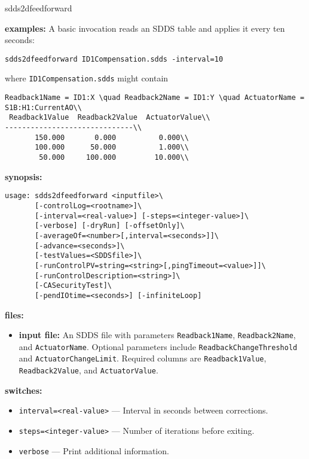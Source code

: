 \begin{sddsprog}{sdds2dfeedforward}
\item \textbf{examples:}
A basic invocation reads an SDDS table and applies it every ten seconds:
\begin{verbatim}
sdds2dfeedforward ID1Compensation.sdds -interval=10
\end{verbatim}
where \verb+ID1Compensation.sdds+ might contain
\begin{verbatim}
Readback1Name = ID1:X \quad Readback2Name = ID1:Y \quad ActuatorName = S1B:H1:CurrentAO\\
 Readback1Value  Readback2Value  ActuatorValue\\
------------------------------\\
       150.000       0.000          0.000\\
       100.000      50.000          1.000\\
        50.000     100.000         10.000\\
\end{verbatim}
\item \textbf{synopsis:}
\begin{verbatim}
usage: sdds2dfeedforward <inputfile>\
       [-controlLog=<rootname>]\
       [-interval=<real-value>] [-steps=<integer-value>]\
       [-verbose] [-dryRun] [-offsetOnly]\
       [-averageOf=<number>[,interval=<seconds>]]\
       [-advance=<seconds>]\
       [-testValues=<SDDSfile>]\
       [-runControlPV=string=<string>[,pingTimeout=<value>]]\
       [-runControlDescription=<string>]\
       [-CASecurityTest]\
       [-pendIOtime=<seconds>] [-infiniteLoop]
\end{verbatim}
\item \textbf{files:}
\begin{itemize}
  \item \textbf{input file:} An SDDS file with parameters \verb+Readback1Name+,
  \verb+Readback2Name+, and \verb+ActuatorName+.  Optional parameters include
  \verb+ReadbackChangeThreshold+ and \verb+ActuatorChangeLimit+.  Required
  columns are \verb+Readback1Value+, \verb+Readback2Value+, and
  \verb+ActuatorValue+.
\end{itemize}
\item \textbf{switches:}
\begin{itemize}
  \item {\tt interval=<real-value>} --- Interval in seconds between corrections.
  \item {\tt steps=<integer-value>} --- Number of iterations before exiting.
  \item {\tt verbose} --- Print additional information.

\end{itemize}
\end{sddsprog}
